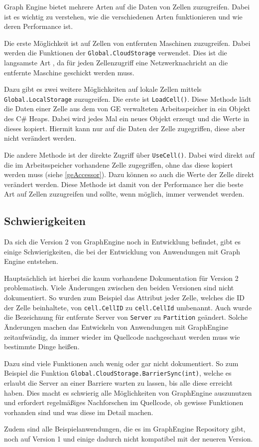 Graph Engine bietet mehrere Arten auf die Daten von Zellen zuzugreifen. Dabei ist es wichtig zu verstehen, wie die verschiedenen Arten funktionieren und wie deren Performance ist.

Die erste Möglichkeit ist auf Zellen von entfernten Maschinen zuzugreifen. Dabei werden die Funktionen der \verb|Global.CloudStorage| verwendet. Dies ist die langsamste Art , da für jeden Zellenzugriff eine Netzwerknachricht an die entfernte Maschine geschickt werden muss.

Dazu gibt es zwei weitere Möglichkeiten auf lokale Zellen mittels \verb|Global.LocalStorage| zuzugreifen. Die erste ist \verb|LoadCell()|. Diese Methode lädt die Daten einer Zelle aus dem von GE verwalteten Arbeitsspeicher in ein Objekt des C\# Heaps.
Dabei wird jedes Mal ein neues Objekt erzeugt und die Werte in dieses kopiert. Hiermit kann nur auf die Daten der Zelle zugegriffen, diese aber nicht verändert werden.

Die andere Methode ist der direkte Zugriff über \verb|UseCell()|. Dabei wird direkt auf die im Arbeitsspeicher vorhandene Zelle zugegriffen, ohne das diese kopiert werden muss (siehe \ref{geAccessor}). Dazu können so auch die Werte der Zelle direkt verändert werden. Diese Methode ist damit von der Performance her die beste Art auf Zellen zuzugreifen und sollte, wenn möglich, immer verwendet werden.



\subsection{Schwierigkeiten}

Da sich die Version 2 von GraphEngine noch in Entwicklung befindet, gibt es einige Schwierigkeiten, die bei der Entwicklung von Anwendungen mit Graph Engine entstehen.

Hauptsächlich ist hierbei die kaum vorhandene Dokumentation für Version 2 problematisch. Viele Änderungen zwischen den beiden Versionen sind nicht dokumentiert. So wurden zum Beispiel
das Attribut jeder Zelle, welches die ID der Zelle beinhaltete, von \verb|cell.CellID| zu \verb|cell.CellId| umbenannt. Auch wurde die Bezeichnung für entfernte Server von \verb|Server| zu \verb|Partition| geändert.
Solche Änderungen machen das Entwickeln von Anwendungen mit GraphEngine zeitaufwändig, da immer wieder im Quellcode nachgeschaut werden muss wie bestimmte Dinge heißen. 

Dazu sind viele Funktionen auch wenig oder gar nicht dokumentiert. So zum Beispiel die Funktion \verb|Global.CloudStorage.BarrierSync(int)|, welche es erlaubt die Server an einer Barriere warten zu lassen, bis alle diese erreicht haben.
Dies macht es schwierig alle Möglichkeiten von GraphEngine auszunutzen und erfordert regelmäßiges Nachforschen im Quellcode, ob gewisse Funktionen vorhanden sind und was diese im Detail machen.

Zudem sind alle Beispielanwendungen, die es im GraphEngine Repository gibt, noch auf Version 1 und einige dadurch nicht kompatibel mit der neueren Version.


